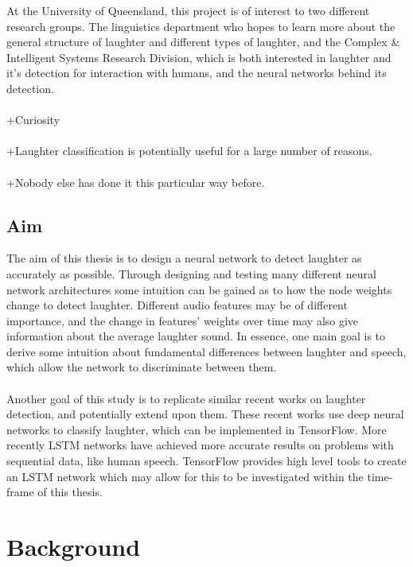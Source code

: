 \documentclass[a4paper,11pt,notitlepage]{article}
\begin{document}
At the University of Queensland, this project is of interest to two different research groups. The linguistics department who hopes to learn more about the general structure of laughter and different types of laughter, and the Complex \& Intelligent Systems Research Division, which is both interested in laughter and it's detection for interaction with humans, and the neural networks behind its detection.\\
\\
+Curiosity\\
\\
+Laughter classification is potentially useful for a large number of reasons.\\
\\
+Nobody else has done it this particular way before.

\subsection{Aim}


The aim of this thesis is to design a neural network to detect laughter as accurately as possible. Through designing and testing many different neural network architectures some intuition can be gained as to how the node weights change to detect laughter. Different audio features may be of different importance, and the change in features' weights over time may also give information about the average laughter sound. In essence, one main goal is to derive some intuition about fundamental differences between laughter and speech, which allow the network to discriminate between them.\\
\\
Another goal of this study is to replicate similar\cite{gosztolya2016laughter} recent works on laughter detection, and potentially extend upon them. These recent works use deep neural networks to classify laughter, which can be implemented in TensorFlow. More recently LSTM networks have achieved more accurate results on problems with sequential data, like human speech.\cite{hannun2014deep,mozilladeepspeech} TensorFlow provides high level tools to create an LSTM network which may allow for this to be investigated within the time-frame of this thesis.

\newpage

\section{Background}
\end{document}
